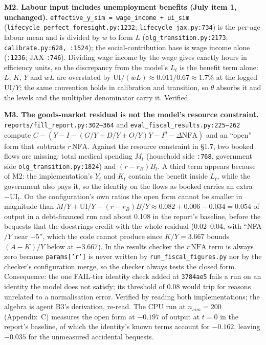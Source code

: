 \documentclass[11pt,a4paper]{article}
\newcommand{\code}[1]{\texttt{#1}}
\begin{document}
\textbf{M2. Labour input includes unemployment benefits (July item 1, unchanged).} \code{effective_y_sim = wage_income + ui_sim} (\code{lifecycle_perfect_foresight.py:1232}; \code{lifecycle_jax.py:734}) is the per-age labour mean and is divided by $w$ to form $L$ (\code{olg_transition.py:2173}; \code{calibrate.py:628, :1524}); the social-contribution base is wage income alone (\code{:1236}; JAX \code{:746}). Dividing wage income by the wage gives exactly hours in efficiency units, so the discrepancy from the model's $L_t$ is the benefit term alone: $L$, $K$, $Y$ and $wL$ are overstated by UI$/(wL) \approx 0.011/0.67 \approx 1.7\%$ at the logged UI$/Y$; the same convention holds in calibration and transition, so $\theta$ absorbs it and the levels and the multiplier denominator carry it. Verified.

\textbf{M3. The goods-market residual is not the model's resource constraint.} \code{reports/fill_report.py:302--364} and \code{eval_fiscal_results.py:225--262} compute $C - (Y - I - (G/Y + D/Y + O/Y)Y - I^g - \Delta\mathrm{NFA})$ and an ``open'' form that subtracts $r\,\mathrm{NFA}$. Against the resource constraint in \S1.7, two booked flows are missing: total medical spending $M_t$ (household side \code{:768}, government side \code{olg_transition.py:1824}) and $(r - r_B)B_t$. A third term appears because of M2: the implementation's $Y_t$ and $K_t$ contain the benefit inside $L_t$, while the government also pays it, so the identity on the flows as booked carries an extra $-\mathrm{UI}_t$. On the configuration's own ratios the open form cannot be smaller in magnitude than $M/Y + \mathrm{UI}/Y - (r - r_B)B/Y \approx 0.082 + 0.006 - 0.034 = 0.054$ of output in a debt-financed run and about 0.108 in the report's baseline, before the bequests that the docstrings credit with the whole residual (0.02--0.04, with ``NFA$/Y$ near $-5$'', which the code cannot produce since $K/Y = 3.667$ bounds $(A - K)/Y$ below at $-3.667$). In the results checker the $r\,\mathrm{NFA}$ term is always zero because \code{params['r']} is never written by \code{run_fiscal_figures.py} nor by the checker's configuration merge, so the checker always tests the closed form. Consequence: the one FAIL-tier identity check added at \code{3784ae5} fails a run on an identity the model does not satisfy; its threshold of 0.08 would trip for reasons unrelated to a normalisation error. Verified by reading both implementations; the algebra is agent B3's derivation, re-read. The CPU run at $n_{sim} = 200$ (Appendix~C) measures the open form at $-0.197$ of output at $t = 0$ in the report's baseline, of which the identity's known terms account for $-0.162$, leaving $-0.035$ for the unmeasured accidental bequests.
\end{document}
